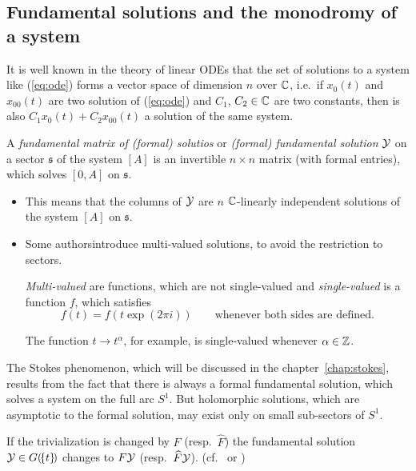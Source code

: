 \subsection{Fundamental solutions and the monodromy of a system}
It is well known in the theory of linear ODEs that the set of solutions to
a system like (\ref{eq:ode}) forms a vector space of dimension $n$ over $\mathbb{C}$,
i.e.\ if $x_0(t)$ and $x_{00}(t)$ are two solution of (\ref{eq:ode}) and $C_1$,
$C_2\in\mathbb{C}$ are two constants, then is also $C_1x_0(t)+C_2x_{00}(t)$ a solution
of the same system.
\begin{defn}
  A \emph{fundamental matrix of (formal) solutios} or \emph{(formal)
  fundamental solution} $\mathcal{Y}$ on a sector $\mathfrak{s}$ of the
  system $[A]$ is an invertible $n\times n$ matrix (with formal entries), which
  solves $[0,A]$ on $\mathfrak{s}$.
  \begin{s-rem}
    \begin{itemize}
      \item This means that the columns of $\mathcal{Y}$ are $n$ $\mathbb{C}$-linearly
        independent solutions of the system $[A]$ on $\mathfrak{s}$.
      \item Some authors\PROBLEM[?] introduce multi-valued solutions, to avoid
        the restriction to sectors.

        \begin{einr}
          \emph{Multi-valued} are functions, which are not single-valued and
          \emph{single-valued} is a function $f$, which satisfies
          \[
            f(t)=f(t\exp(2\pi i)) \qquad\text{whenever both sides are defined.}
          \]
        \end{einr}
        The function $t\to t^\alpha$, for example, is single-valued whenever
        $\alpha\in\mathbb{Z}$.
    \end{itemize}
  \end{s-rem}
\end{defn}
The Stokes phenomenon, which will be discussed in the
chapter~\ref{chap:stokes}, results from the fact that there is always a formal
fundamental solution, which solves a system on the full arc $S^1$.
But holomorphic solutions, which are asymptotic to the formal solution, may
exist only on small sub-sectors of $S^1$.
\begin{rem}
  If the trivialization is changed by $F$ (resp.\ $\hat F$) the fundamental
  solution $\mathcal{Y}\in G(\!\{t\}\!)$ changes to $F\mathcal{Y}$ (resp.\ $\widehat F\mathcal{Y}$).
  (cf.\ \cite[Thm.4.3.1]{Loday2014} or \cite[2.1.3]{Zein2009})
\end{rem}

